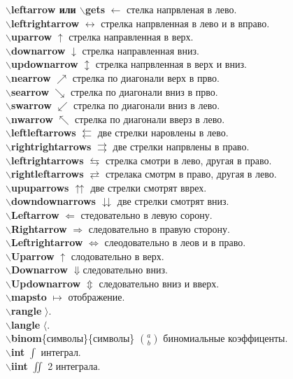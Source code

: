 \documentclass{article}
\newcommand{\bb}[1]{{\bfseries $\backslash$#1}} %
\begin{document}
\bb{leftarrow или $\backslash$gets} $\leftarrow$ стелка напрвленая в лево.\\
\bb{leftrightarrow} $\leftrightarrow$ стрелка напрвленная в лево и в вправо.\\
\bb{uparrow} $\uparrow$ стрелка направленная в верх.\\
\bb{downarrow} $\downarrow$ стрелка направленная вниз.\\
\bb{updownarrow} $\updownarrow$ стрелка напрвленная в верх и вниз.\\
\bb{nearrow} $\nearrow$ стрелка  по диагонали верх в прво.\\
\bb{searrow} $\searrow$ стрелка по диагонали вниз в прво.\\
\bb{swarrow} $\swarrow$ стрелка по диагонали вниз в лево.\\
\bb{nwarrow} $\nwarrow$ стрелка по диагонали вверз в лево.\\
\bb{leftleftarrows} $\leftleftarrows$ две стрелки наровлены в лево.\\
\bb{rightrightarrows} $\rightrightarrows$ две стрелки напрвлены в право.\\
\bb{leftrightarrows} $\leftrightarrows$ стрелка смотри в лево, другая в право.\\
\bb{rightleftarrows} $\rightleftarrows$ стрелака смотрм в право, другая в лево.\\
\bb{upuparrows} $\upuparrows$ две стрелки смотрят вврех.\\
\bb{downdownarrows} $\downdownarrows$ две стрелки смотрят вниз.\\
\bb{Leftarrow} $\Leftarrow$ стедовательно в левую сорону.\\
\bb{Rightarrow} $\Rightarrow$ следовательно в правую сторону.\\
\bb{Leftrightarrow} $\Leftrightarrow$ слеодовательно в леов и в право.\\
\bb{Uparrow} $\uparrow$ слодовательно в верх.\\
\bb{Downarrow} $\Downarrow$следовательно вниз.\\
\bb{Updownarrow} $\Updownarrow$ следовательно вниз и вверх.\\
\bb{mapsto} $\mapsto$ отображение.\\
\bb{rangle} $\rangle$.\\
\bb{langle} $\langle$.\\
\bb{binom}\{символы\}\{символы\} $\binom{a}{b}$ биномиальные коэффиценты.\\
\bb{int} $\int$ интеграл.\\
\bb{iint} $\iint$ 2 интеграла.\\
\end{document}
